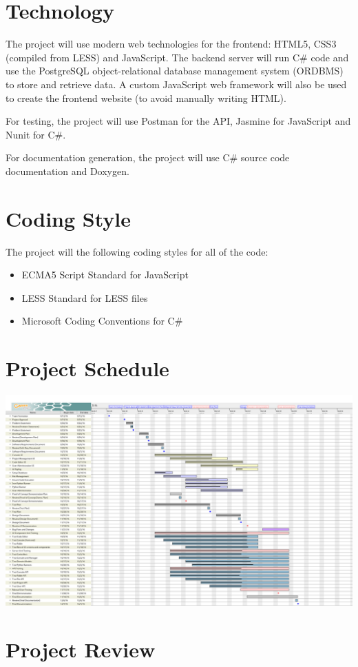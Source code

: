 \documentclass{article}
\begin{document}
\section{Technology}
The project will use modern web technologies for the frontend: HTML5, CSS3
(compiled from LESS) and JavaScript. The backend server will run C\# code and
use the PostgreSQL object-relational database management system (ORDBMS) to
store and retrieve data. A custom JavaScript web framework will also be used to
create the frontend website (to avoid manually writing HTML).

For testing, the project will use Postman for the API, Jasmine for JavaScript
and Nunit for C\#.

For documentation generation, the project will use C\# source code
documentation and Doxygen.

\section{Coding Style}
The project will the following coding styles for all of the code:
\begin{itemize}
  \item ECMA5 Script Standard for JavaScript
  \item LESS Standard for LESS files
  \item Microsoft Coding Conventions for C\#
\end{itemize}

\section{Project Schedule}

\includegraphics[width=\textwidth]{../ProjectSchedule/schedule}

\section{Project Review}
\end{document}
